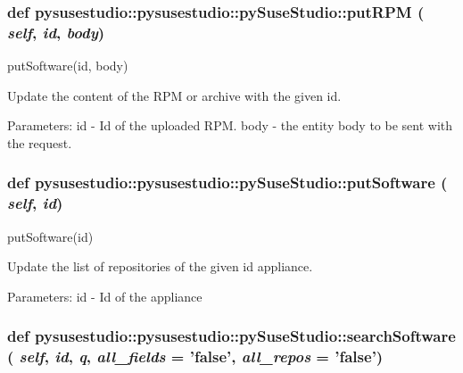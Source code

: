  \hypertarget{classpysusestudio_1_1pysusestudio_1_1py_suse_studio_a0e6e12957104f14936bcce1c48756c4b}{
\subsubsection[{putRPM}]{\setlength{\rightskip}{0pt plus 5cm}def pysusestudio::pysusestudio::pySuseStudio::putRPM ( {\em self}, \/   {\em id}, \/   {\em body})}}
\label{classpysusestudio_1_1pysusestudio_1_1py_suse_studio_a0e6e12957104f14936bcce1c48756c4b}
\begin{DoxyVerb}putSoftware(id, body)

        Update the content of the RPM or archive with the given id.  
            
            Parameters:
id - Id of the uploaded RPM. 
body - the entity body to be sent with the request.

\end{DoxyVerb}
 \hypertarget{classpysusestudio_1_1pysusestudio_1_1py_suse_studio_a93f42f83557d66485a189ca96ba0842f}{
\subsubsection[{putSoftware}]{\setlength{\rightskip}{0pt plus 5cm}def pysusestudio::pysusestudio::pySuseStudio::putSoftware ( {\em self}, \/   {\em id})}}
\label{classpysusestudio_1_1pysusestudio_1_1py_suse_studio_a93f42f83557d66485a189ca96ba0842f}
\begin{DoxyVerb}putSoftware(id)

        Update the list of repositories of the given id appliance.  
            
            Parameters:
id - Id of the appliance

\end{DoxyVerb}
 \hypertarget{classpysusestudio_1_1pysusestudio_1_1py_suse_studio_a0d6f95f15e9f44dd258788e43824d8a6}{
\subsubsection[{searchSoftware}]{\setlength{\rightskip}{0pt plus 5cm}def pysusestudio::pysusestudio::pySuseStudio::searchSoftware ( {\em self}, \/   {\em id}, \/   {\em q}, \/   {\em all\_\-fields} = {\ttfamily 'false'}, \/   {\em all\_\-repos} = {\ttfamily 'false'})}}
